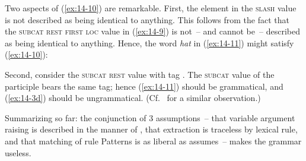 \documentclass[output=paper]{LSP/langsci}
\begin{document}
\begin{exe}
\ex
\label{ex:14-10}
\end{exe}
\randnum\label{rn:14-18}Two aspects of (\ref{ex:14-10}) are remarkable. First, the element in the \textsc{slash}
value is not described as being identical to anything. This follows
from the fact that the \textsc{subcat} \textsc{rest} \textsc{first} \textsc{loc} value in (\ref{ex:14-9}) is not~-- and
cannot be~-- described as being identical to anything. Hence, the word
\textit{hat} in (\ref{ex:14-11}) might satisfy (\ref{ex:14-10}):
\begin{exe}
\end{exe}
Second, consider the \textsc{subcat} \textsc{rest} value with tag . The \textsc{subcat} value
of the participle bears the same tag; hence (\ref{ex:14-11}) should be
grammatical, and (\ref{ex:14-3d}) should be ungrammatical. (Cf.\ \citealt[19]{HinrichsNakazawa1994} for a similar observation.)

\randnum\label{rn:14-19}Summarizing so far: the conjunction of 3
assumptions~-- that variable argument raising is described in the
manner of \citet{HinrichsNakazawa1993b}, that extraction is traceless by
lexical rule, and that matching of rule Patterns is as liberal as \citet{PollardSagE1994}
assumes~-- makes the grammar useless.
\end{document}
